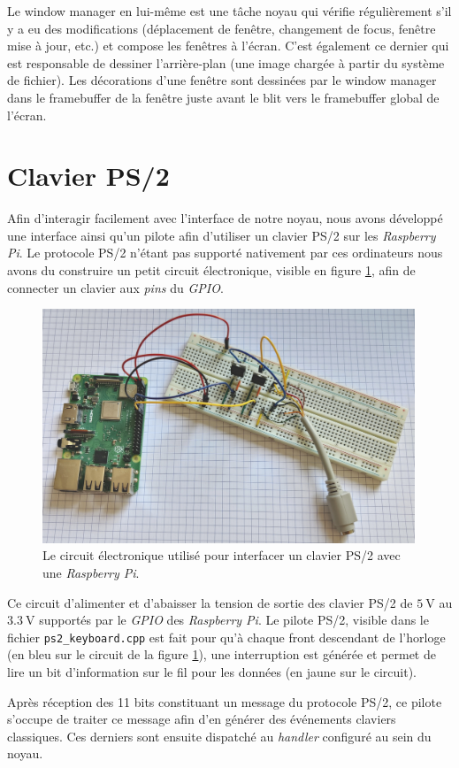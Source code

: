 \documentclass[french, 12pt]{article}
\newcommand{\rpi}{\emph{Raspberry Pi}}
\begin{document}
Le window manager en lui-même est une tâche noyau qui vérifie régulièrement s'il y a eu des modifications (déplacement de fenêtre, changement de focus, fenêtre mise à jour, etc.) et compose les fenêtres à l'écran. C'est également ce dernier qui est responsable de dessiner l'arrière-plan (une image chargée à partir du système de fichier).  Les décorations d'une fenêtre sont dessinées par le window manager dans le framebuffer de la fenêtre juste avant le blit vers le framebuffer global de l'écran.

\section{Clavier PS/2}
Afin d'interagir facilement avec l'interface de notre noyau, nous avons
développé une interface ainsi qu'un pilote afin d'utiliser un clavier PS/2 sur
les \rpi{}. Le protocole PS/2 n'étant pas supporté nativement par ces
ordinateurs nous avons du construire un petit circuit électronique, visible en
figure \ref{img:ps2-cables}, afin de connecter un clavier aux \textit{pins} du
\textit{GPIO}.

\begin{figure}[htp]
    \begin{center}
        \includegraphics[height=7cm]{ps2-cables.jpg}
    \end{center}
    \caption{Le circuit électronique utilisé pour interfacer un clavier PS/2
        avec une \rpi{}.}
    \label{img:ps2-cables}
\end{figure}

Ce circuit d'alimenter et d'abaisser la tension de sortie des clavier PS/2 de
$\SI{5}{\volt}$ au $\SI{3.3}{\volt}$ supportés par le \textit{GPIO} des \rpi{}.
Le pilote PS/2, visible dans le fichier \texttt{ps2\_keyboard.cpp} est fait pour
qu'à chaque front descendant de l'horloge (en bleu sur le circuit de la figure
\ref{img:ps2-cables}), une interruption est générée et permet de lire un
bit d'information sur le fil pour les données (en jaune sur le circuit).

Après réception des 11 bits constituant un message du protocole PS/2, ce pilote
s'occupe de traiter ce message afin d'en générer des événements claviers
classiques. Ces derniers sont ensuite dispatché au \textit{handler} configuré au
sein du noyau.
\end{document}
